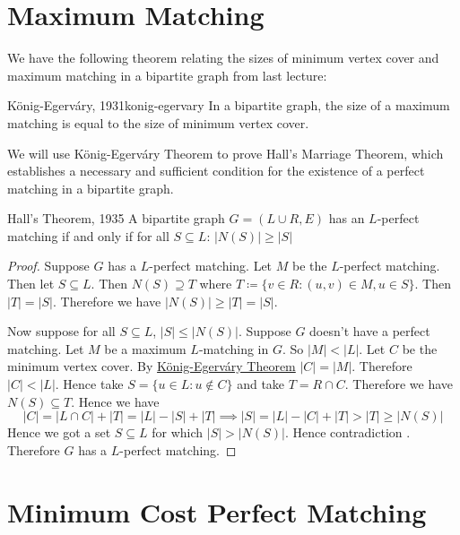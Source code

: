 \documentclass[twoside]{article}
\begin{document}
\section{Maximum Matching}
We have the following theorem relating the sizes of minimum vertex cover and maximum matching in a bipartite graph from last lecture:
\begin{theorem}{K\"{o}nig-Egerv\'{a}ry, 1931}{konig-egervary}
	In a bipartite graph, the size of a maximum matching is equal to the size of minimum vertex cover.
\end{theorem}

We will use K\"{o}nig-Egerv\'{a}ry Theorem to prove Hall's Marriage Theorem, which establishes a necessary and sufficient condition for the existence of a perfect matching in a bipartite graph.
\begin{theorem}{Hall's Theorem, 1935}{}
	A bipartite graph $G=(L\cup R,E)$ has an $L$-perfect matching if and only if for all $S\subseteq L$: $|N(S)|\geq |S|$
\end{theorem}
\begin{proof}
	Suppose $G$ has a $L$-perfect matching. Let $M$ be the $L$-perfect matching. Then let $S\subseteq L$. Then $N(S)\supseteq T$ where $T\coloneqq\{v\in R\colon (u,v)\in M, u\in S\}$. Then $|T|=|S|$. Therefore we have $|N(S)|\geq |T|=|S|$. 
	
	Now suppose for all $S\subseteq L$, $|S|\leq |N(S)|$. Suppose $G$ doesn't have a perfect matching. Let $M$ be a maximum $L$-matching in $G$. So $|M|<|L|$. Let $C$ be the minimum vertex cover. By \hyperref[th:konig-egervary]{K\"{o}nig-Egerv\'{a}ry Theorem} $|C|=|M|$. Therefore $|C|<|L|$. Hence take $S=\{u\in L\colon u\notin C\}$ and take $T=R\cap C$. Therefore we have $N(S)\subseteq T$. Hence we have $$|C|=|L\cap C|+|T|=|L|-|S|+|T|\implies |S|=|L|-|C|+|T|> |T|\geq |N(S)|$$Hence we got a set $S\subseteq L$ for which $|S|> |N(S)|$. Hence contradiction \ctr. Therefore $G$ has a $L$-perfect matching.
\end{proof}
\section{Minimum Cost Perfect Matching}
\begin{algoprob}
\end{algoprob}
\end{document}
